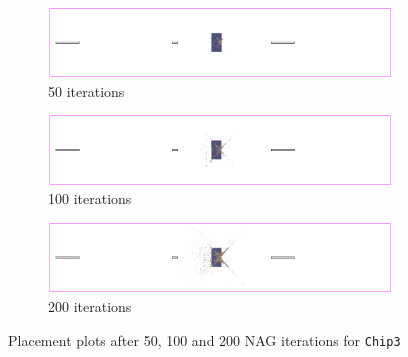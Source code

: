 \begin{figure}[p]
 \centering

 \begin{subfigure}{\textwidth}
  \includegraphics[width=\textwidth]{epsilon/placement_Chip3_50_iterations.png}
  \caption{50 iterations}
 \end{subfigure}
 
 \bigskip
 
 \begin{subfigure}{\textwidth}
  \includegraphics[width=\textwidth]{epsilon/placement_Chip3_100_iterations.png}
  \caption{100 iterations}
 \end{subfigure}
 
 \bigskip
 
 \begin{subfigure}{\textwidth}
  \includegraphics[width=\textwidth]{epsilon/placement_Chip3_200_iterations.png}
  \caption{200 iterations}
 \end{subfigure}

 \caption{Placement plots after 50, 100 and 200 NAG iterations for \texttt{Chip3}}
 \label{fig:placement_Chip3_depending_on_max_iterations}
\end{figure}

